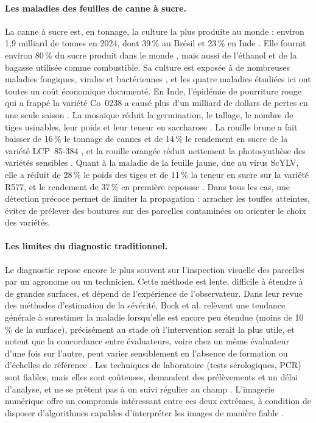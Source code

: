 \paragraph{Les maladies des feuilles de canne à sucre.} La canne à sucre est, en tonnage, la culture la plus produite au monde : environ 1,9 milliard de tonnes en 2024, dont 39\,\% au Brésil et 23\,\% en Inde \cite{fao2025production}. Elle fournit environ 80\,\% du sucre produit dans le monde \cite{garsmeur2018mosaic}, mais aussi de l'éthanol et de la bagasse utilisée comme combustible. Sa culture est exposée à de nombreuses maladies fongiques, virales et bactériennes \cite{rott2000guide, viswanathan2011sugarcane}, et les quatre maladies étudiées ici ont toutes un coût économique documenté. En Inde, l'épidémie de pourriture rouge qui a frappé la variété Co~0238 a causé plus d'un milliard de dollars de pertes en une seule saison \cite{viswanathan2021redrot}. La mosaïque réduit la germination, le tallage, le nombre de tiges usinables, leur poids et leur teneur en saccharose \cite{viswanathan2005mosaic}. La rouille brune a fait baisser de 16\,\% le tonnage de cannes et de 14\,\% le rendement en sucre de la variété LCP~85-384 \cite{hoy2009brownrust}, et la rouille orangée réduit nettement la photosynthèse des variétés sensibles \cite{zhao2011orangerust}. Quant à la maladie de la feuille jaune, due au virus ScYLV, elle a réduit de 28\,\% le poids des tiges et de 11\,\% la teneur en sucre sur la variété R577, et le rendement de 37\,\% en première repousse \cite{rassaby2003yellow, elsayed2015scylv}. Dans tous les cas, une détection précoce permet de limiter la propagation : arracher les touffes atteintes, éviter de prélever des boutures sur des parcelles contaminées ou orienter le choix des variétés.

\paragraph{Les limites du diagnostic traditionnel.} Le diagnostic repose encore le plus souvent sur l'inspection visuelle des parcelles par un agronome ou un technicien. Cette méthode est lente, difficile à étendre à de grandes surfaces, et dépend de l'expérience de l'observateur. Dans leur revue des méthodes d'estimation de la sévérité, Bock et al. relèvent une tendance générale à surestimer la maladie lorsqu'elle est encore peu étendue (moins de 10\,\% de la surface), précisément au stade où l'intervention serait la plus utile, et notent que la concordance entre évaluateurs, voire chez un même évaluateur d'une fois sur l'autre, peut varier sensiblement en l'absence de formation ou d'échelles de référence \cite{bock2010severity}. Les techniques de laboratoire (tests sérologiques, PCR) sont fiables, mais elles sont coûteuses, demandent des prélèvements et un délai d'analyse, et ne se prêtent pas à un suivi régulier au champ \cite{martinelli2015advanced}. L'imagerie numérique offre un compromis intéressant entre ces deux extrêmes, à condition de disposer d'algorithmes capables d'interpréter les images de manière fiable \cite{mahlein2016plant, barbedo2016review}.


